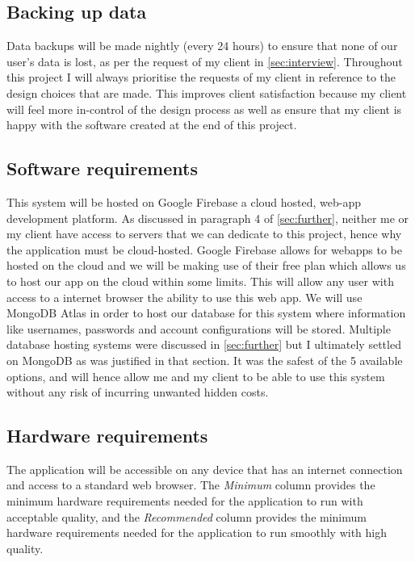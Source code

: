 \subsection{Backing up data}

Data backups will be made nightly (every 24 hours) to ensure
that none of our user's data is lost, as per the request of
my client in \ref{sec:interview}. Throughout this project I 
will always prioritise the requests of my client in reference
to the design choices that are made. This improves client 
satisfaction because my client will feel more in-control of
the design process as well as ensure that my client is happy
with the software created at the end of this project.

\subsection{Software requirements}

This system will be hosted on Google Firebase a cloud hosted, 
web-app development platform. As discussed in paragraph 4 of
\ref{sec:further}, neither me or my client have access to 
servers that we can dedicate to this project, hence why the 
application must be cloud-hosted. Google Firebase allows for
webapps to be hosted on the cloud and we will be making use
of their free plan which allows us to host our app on the 
cloud within some limits. This will allow any user with 
access to a internet browser the ability to use this web 
app. We will use MongoDB
Atlas in order to host our database for this system where 
information like usernames, passwords and account
configurations will be stored. Multiple database hosting 
systems were discussed in \ref{sec:further} but I ultimately 
settled on MongoDB as was justified in that section. It was
the safest of the 5 available options, and will hence allow
me and my client to be able to use this system without any
risk of incurring unwanted hidden costs.

\subsection{Hardware requirements}
\label{sec:hardware}

The application will be accessible on any device that has an
internet connection and access to a standard web browser. The
\textit{Minimum} column provides the minimum hardware
requirements needed for the application to run with acceptable
quality, and the \textit{Recommended} column provides the 
minimum hardware requirements needed for the application to
run smoothly with high quality.

